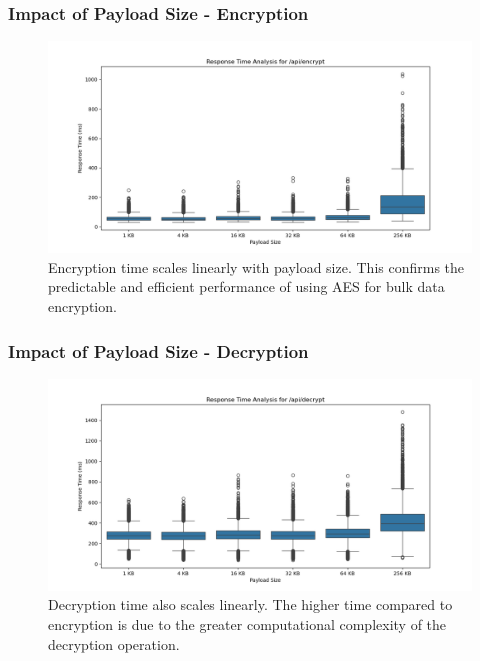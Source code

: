 \documentclass{beamer}
\begin{document}
\begin{frame}
\frametitle{Impact of Payload Size - Encryption}
\begin{figure}
\includegraphics[width=\textwidth,height=0.75\textheight,keepaspectratio]{images/phase2/response_time_api_encrypt.png}
\caption{Encryption time scales linearly with payload size. This confirms the predictable and efficient performance of using AES for bulk data encryption.}
\end{figure}
\end{frame}

\begin{frame}
\frametitle{Impact of Payload Size - Decryption}
\begin{figure}
\includegraphics[width=\textwidth,height=0.75\textheight,keepaspectratio]{images/phase2/response_time_api_decrypt.png}
\caption{Decryption time also scales linearly. The higher time compared to encryption is due to the greater computational complexity of the decryption operation.}
\end{figure}
\end{frame}
\end{document}
